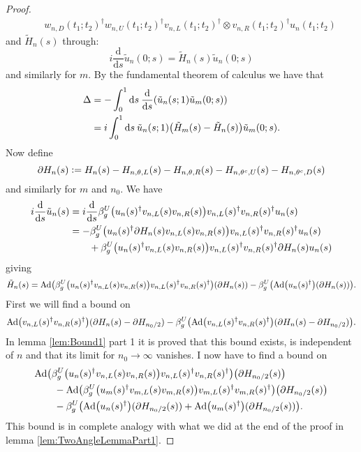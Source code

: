 \documentclass[12pt,a4paper,twoside]{article}
\renewcommand{\d}{\text{d}}
\newcommand{\defeq}{\vcentcolon=}
\let\originalleft\left
\let\originalright\right
\renewcommand{\left}{\mathopen{}\mathclose\bgroup\originalleft}
\renewcommand{\right}{\aftergroup\egroup\originalright}
\newcommand{\Ad}[1]{\textrm{Ad}\left(#1\right)}
\theoremstyle{definition}
\numberwithin{equation}{section}
\begin{document}
\begin{proof}
\begin{align}
 		\nonumber
 		&\quad w_{n,D}(t_1;t_2)^\dagger w_{n,U}(t_1;t_2)^\dagger v_{n,L}(t_1;t_2)^\dagger\otimes v_{n,R}(t_1;t_2)^\dagger u_{n}(t_1;t_2)
 	\end{align}
 	and $\tilde{H}_n(s)$ through:
 	\begin{equation}
 		i\frac{\d}{\d s}\tilde{u}_n(0;s)=\tilde{H}_n(s)\tilde{u}_n(0;s)
 	\end{equation}
 	and similarly for $m$. By the fundamental theorem of calculus we have that
 	\begin{align}
 		\Delta&=-\int_0^1\d s\:\frac{\d}{\d s}\left(\tilde{u}_n(s;1)\tilde{u}_m(0;s)\right)\\
 		&=i\int_0^1\d s \: \tilde{u}_n(s;1)\left(\tilde{H}_m(s)-\tilde{H}_n(s)\right)\tilde{u}_m(0;s).
 	\end{align}
 	Now define
 	\begin{equation}
 	\partial H_n(s)\defeq H_n(s)-H_{n,\theta,L}(s)-H_{n,\theta,R}(s)-H_{n,\theta^c,U}(s)-H_{n,\theta^c,D}(s)
 	\end{equation}
 	and similarly for $m$ and $n_0$. We have
 	\begin{align}
 	i\frac{\d}{\d s}\tilde{u}_n(s)&=i\frac{\d}{\d s}\beta_g^U\left(u_n(s)^\dagger v_{n,L}(s) v_{n,R}(s)\right)v_{n,L}(s)^\dagger v_{n,R}(s)^\dagger u_{n}(s)\\
 	&=-\beta_g^U\left(u_n(s)^\dagger \partial H_n(s) v_{n,L}(s) v_{n,R}(s)\right)v_{n,L}(s)^\dagger v_{n,R}(s)^\dagger u_{n}(s)\\
 	\nonumber
 	&\qquad +\beta_g^U\left(u_n(s)^\dagger v_{n,L}(s) v_{n,R}(s)\right)v_{n,L}(s)^\dagger v_{n,R}(s)^\dagger \partial H_n(s) u_{n}(s)
 	\end{align}
 	giving
 	\begin{equation}
 	\tilde{H}_n(s)=\Ad{\beta_g^U\left(u_n(s)^\dagger v_{n,L}(s) v_{n,R}(s)\right)v_{n,L}(s)^\dagger v_{n,R}(s)^\dagger}\left(\partial H_n(s)\right)-\beta_g^U\left(\Ad{u_n(s)^\dagger}(\partial H_n(s))\right).
 	\end{equation}
 	First we will find a bound on
 	\begin{equation}
 	\Ad{v_{n,L}(s)^\dagger v_{n,R}(s)^\dagger}(\partial H_n(s)-\partial H_{n_0/2})-\beta_g^U\left(\Ad{v_{n,L}(s)^\dagger v_{n,R}(s)^\dagger}(\partial H_n(s)-\partial H_{n_0/2})\right).
 	\end{equation}
 	In lemma \ref{lem:Bound1} part 1 it is proved that this bound exists, is independent of $n$ and that its limit for $n_0\rightarrow\infty$ vanishes. I now have to find a bound on
 	\begin{align}
 	&\Ad{\beta_g^U\left(u_n(s)^\dagger v_{n,L}(s) v_{n,R}(s)\right)v_{n,L}(s)^\dagger v_{n,R}(s)^\dagger}\left(\partial H_{n_0/2}(s)\right)\\
 	\nonumber
 	&\qquad-\Ad{\beta_g^U\left(u_m(s)^\dagger v_{m,L}(s) v_{m,R}(s)\right)v_{m,L}(s)^\dagger v_{m,R}(s)^\dagger}\left(\partial H_{n_0/2}(s)\right)\\
 	\nonumber
 	&\qquad -\beta_g^U\left(\Ad{u_n(s)^\dagger}(\partial H_{n_0/2}(s))+\Ad{u_m(s)^\dagger}(\partial H_{n_0/2}(s))\right).
 	\end{align}
 	{\color{red}This bound is in complete analogy with what we did at the end of the proof in lemma \ref{lem:TwoAngleLemmaPart1}.}
 \end{proof}
\end{document}
